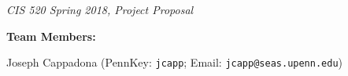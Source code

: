 \documentclass[twoside,11pt]{article}
\renewcommand{\>}{{\rightarrow}}
\newcommand{\1}{{\mathbf 1}}
\newcommand{\0}{{\mathbf 0}}
\begin{document}

\emph{\footnotesize{CIS 520 Spring 2018, Project Proposal}}


\vspace{12pt}

\textbf{\Large{}}

\vspace{1cm}

\textbf{Team Members:}

Joseph Cappadona (PennKey: \texttt{jcapp}; Email: \texttt{jcapp@seas.upenn.edu}) \\


\vspace{2cm}

\begin{comment}
    \textbf{Assigned Project Mentor:}

    TA-Firstname TA-Lastname

    \vspace{1cm}

    \textbf{Team Member Contributions:}

    \begin{center}
    \begin{tabular}{|l|l|}
    \hline
    Team Member & Contributions \\
    \hline
    Firstname1 Lastname1 & list of contributions \\
    	& (continue if needed) \\
    \hline
    Firstname2 Lastname2 & list of contributions \\
    	& (continue if needed) \\
    \hline
    Firstname3 Lastname3 & list of contributions \\
    	& (continue if needed) \\
    \hline
    Firstname4 Lastname4 & list of contributions \\
    	& (continue if needed) \\
    \hline
    \end{tabular}
    \end{center}

    \vspace{12pt}

    \textbf{Code Submission:}

    [Mention whether code is being submitted on Canvas or via a github repository; if latter, provide a link to the repository]

\end{comment}
\newpage
\end{document}
